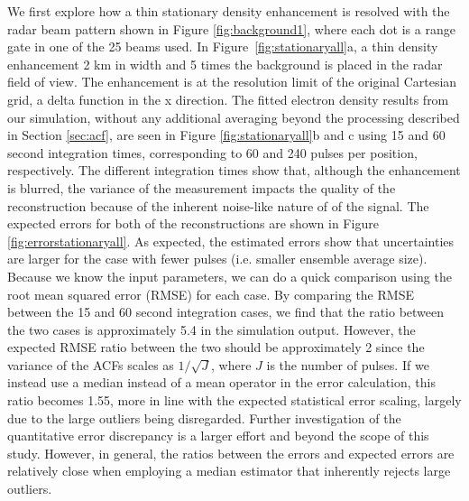 We first explore how a thin stationary density enhancement is resolved with the radar beam pattern shown in Figure \ref{fig:background1}, where each dot is a range gate in one of the 25 beams used. In Figure~\ref{fig:stationaryall}a, a thin density enhancement 2 km in width and 5 times the background is placed in the radar field of view. The enhancement is at the resolution limit of the original Cartesian grid, a delta function in the x direction.  The fitted electron density results from our simulation, without any additional averaging beyond the processing described in Section \ref{sec:acf},
are seen in Figure \ref{fig:stationaryall}b and c using 15 and 60 second integration times, corresponding to 60 and 240 pulses per position, respectively. The different integration times show that, although the enhancement is blurred, the variance of the measurement impacts the quality of the reconstruction because of the inherent noise-like nature of of the signal. The expected errors for both of the reconstructions are shown in Figure \ref{fig:errorstationaryall}. As expected, the estimated errors show that uncertainties are larger for the case with fewer pulses (i.e. smaller ensemble average size). 
Because we know the input parameters, we can do a quick comparison using the root mean squared error (RMSE) for each case. By comparing the RMSE between the 15 and 60 second integration cases, we find that the ratio between the two cases is approximately 5.4 in the simulation output.  However, the expected RMSE ratio between the two should be approximately 2 since the variance of the ACFs scales as $1/\sqrt{J}$, where $J$ is the number of pulses. If we instead use a median instead of a mean operator in the error calculation, this ratio becomes 1.55, more in line with the expected statistical error scaling, largely due to the large outliers being disregarded.  Further investigation of the quantitative error discrepancy is a larger effort and beyond the scope of this study.  However, in general, the ratios between the errors and expected errors are relatively close when employing a median estimator that inherently rejects large outliers.
